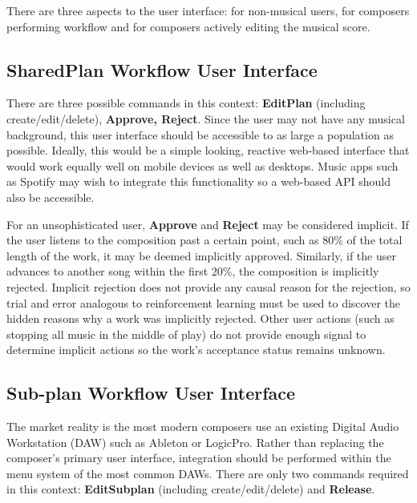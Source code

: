 \documentclass[final,authoryear,5p,times,twocolumn]{elsarticle}
\begin{document}
There are three aspects to the user interface: for non-musical users, for composers performing workflow and for composers actively editing the musical score.

\subsection{SharedPlan Workflow User Interface}

There are three possible commands in this context: \textbf{EditPlan} (including create/edit/delete), \textbf{Approve, Reject}. Since the user may not have any musical background, this user interface should be accessible to as large a population as possible. Ideally, this would be a simple looking, reactive web-based interface that would work equally well on mobile devices as well as desktops. Music apps such as Spotify may wish to integrate this functionality so a web-based API should also be accessible.

For an unsophisticated user, \textbf{Approve} and \textbf{Reject} may be considered implicit. If the user listens to the composition past a certain point, such as 80\% of the total length of the work, it may be deemed implicitly approved. Similarly, if the user advances to another song within the first 20\%, the composition is implicitly rejected. Implicit rejection does not provide any causal reason for the rejection, so trial and error analogous to reinforcement learning must be used to discover the hidden reasons why a work was implicitly rejected. Other user actions (such as stopping all music in the middle of play) do not provide enough signal to determine implicit actions so the work's acceptance status remains unknown.

\subsection{Sub-plan Workflow User Interface}

The market reality is the most modern composers use an existing Digital Audio Workstation (DAW) such as Ableton or LogicPro. Rather than replacing the composer's primary user interface, integration should be performed within the menu system of the most common DAWs. There are only two commands required in this context: \textbf{EditSubplan} (including create/edit/delete) and \textbf{Release}. 

\end{document}
